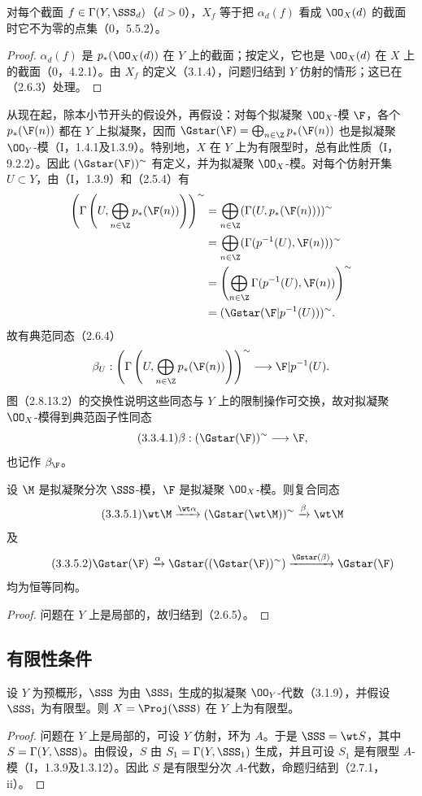 对每个截面 $f\in\Gamma(Y,\SSS_d)$（$d>0$），$X_f$ 等于把 $\alpha_d(f)$ 看成 $\OO_X(d)$ 的截面时它不为零的点集（0，5.5.2）。
\begin{proof}
$\alpha_d(f)$ 是 $p_*(\OO_X(d))$ 在 $Y$ 上的截面；按定义，它也是 $\OO_X(d)$ 在 $X$ 上的截面（0，4.2.1）。由 $X_f$ 的定义（3.1.4），问题归结到 $Y$ 仿射的情形；这已在（2.6.3）处理。
\end{proof}

从现在起，除本小节开头的假设外，再假设：对每个拟凝聚 $\OO_X$-模 $\F$，各个 $p_*(\F(n))$ 都在 $Y$ 上拟凝聚，因而 $\Gstar(\F)=\bigoplus_{n\in\Z}p_*(\F(n))$ 也是拟凝聚 $\OO_Y$-模（I，1.4.1及1.3.9）。特别地，$X$ 在 $Y$ 上为有限型时，总有此性质（I，9.2.2）。因此 $(\Gstar(\F))^\sim$ 有定义，并为拟凝聚 $\OO_X$-模。对每个仿射开集 $U\subset Y$，由（I，1.3.9）和（2.5.4）有
\[
\begin{aligned}
\left(\Gamma\left(U,\bigoplus_{n\in\Z}p_*(\F(n))\right)\right)^\sim
&=\bigoplus_{n\in\Z}(\Gamma(U,p_*(\F(n))))^\sim\\
&=\bigoplus_{n\in\Z}(\Gamma(p^{-1}(U),\F(n)))^\sim\\
&=\left(\bigoplus_{n\in\Z}\Gamma(p^{-1}(U),\F(n))\right)^\sim\\
&=(\Gstar(\F|p^{-1}(U)))^\sim.
\end{aligned}
\]
故有典范同态（2.6.4）
\[
\beta_U:\left(\Gamma\left(U,\bigoplus_{n\in\Z}p_*(\F(n))\right)\right)^\sim
\longrightarrow\F|p^{-1}(U).
\]
图（2.8.13.2）的交换性说明这些同态与 $Y$ 上的限制操作可交换，故对拟凝聚 $\OO_X$-模得到典范函子性同态
\begin{equation}\tag{3.3.4.1}\beta:(\Gstar(\F))^\sim\longrightarrow\F,\end{equation}
也记作 $\beta_{\F}$。

设 $\M$ 是拟凝聚分次 $\SSS$-模，$\F$ 是拟凝聚 $\OO_X$-模。则复合同态
\begin{equation}\tag{3.3.5.1}
\wt\M\xrightarrow{\wt\alpha}(\Gstar(\wt\M))^\sim\xrightarrow{\beta}\wt\M
\end{equation}
及
\begin{equation}\tag{3.3.5.2}
\Gstar(\F)\xrightarrow{\alpha}\Gstar((\Gstar(\F))^\sim)
\xrightarrow{\Gstar(\beta)}\Gstar(\F)
\end{equation}
均为恒等同构。
\begin{proof}
问题在 $Y$ 上是局部的，故归结到（2.6.5）。
\end{proof}

\subsection{有限性条件}
设 $Y$ 为预概形，$\SSS$ 为由 $\SSS_1$ 生成的拟凝聚 $\OO_Y$-代数（3.1.9），并假设 $\SSS_1$ 为有限型。则 $X=\Proj(\SSS)$ 在 $Y$ 上为有限型。
\begin{proof}
问题在 $Y$ 上是局部的，可设 $Y$ 仿射，环为 $A$。于是 $\SSS=\wt S$，其中 $S=\Gamma(Y,\SSS)$。由假设，$S$ 由 $S_1=\Gamma(Y,\SSS_1)$ 生成，并且可设 $S_1$ 是有限型 $A$-模（I，1.3.9及1.3.12）。因此 $S$ 是有限型分次 $A$-代数，命题归结到（2.7.1，ii）。
\end{proof}

